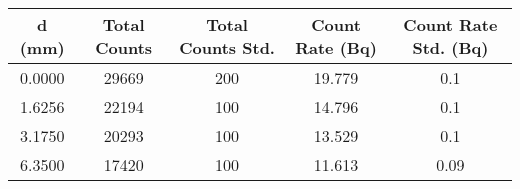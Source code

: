 \begin{tabular}{ccccc}
\toprule
 d (mm) &  Total Counts &  Total Counts Std. &  Count Rate (Bq) &  Count Rate Std. (Bq) \\
\midrule
 0.0000 &       29669 &         200 &        19.779 &              0.1 \\
 1.6256 &       22194 &         100 &        14.796 &              0.1 \\
 3.1750 &       20293 &         100 &        13.529 &              0.1 \\
 6.3500 &       17420 &         100 &        11.613 &              0.09 \\
\bottomrule
\end{tabular}
